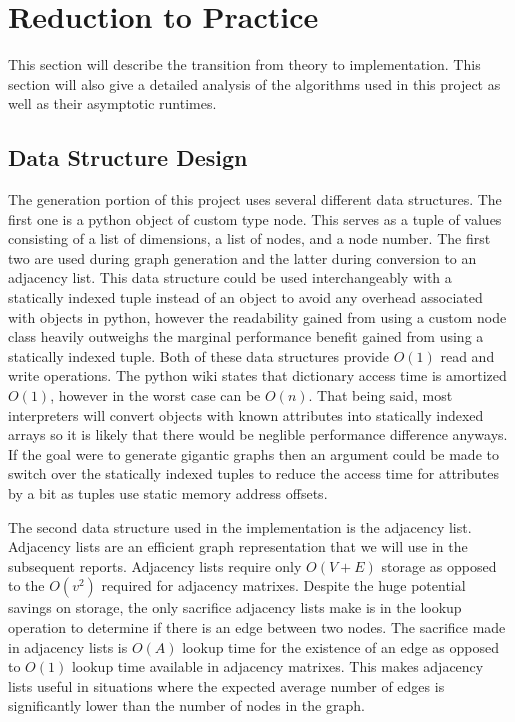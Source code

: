\documentclass{article}
\begin{document}
  \section{Reduction to Practice}
    This section will describe the transition from theory to implementation.
    This section will also give a detailed analysis of the algorithms used in this project as well as their asymptotic runtimes.
	\subsection{Data Structure Design}
		The generation portion of this project uses several different data structures.
		The first one is a python object of custom type node.
		This serves as a tuple of values consisting of a list of dimensions, a list of nodes, and a node number.
		The first two are used during graph generation and the latter during conversion to an adjacency list.
		This data structure could be used interchangeably with a statically indexed tuple instead of an object to avoid any overhead associated with objects in python, however the readability gained from using a custom node class heavily outweighs the marginal performance benefit gained from using a statically indexed tuple.
		Both of these data structures provide $O(1)$ read and write operations.
    The python wiki states that dictionary access time is amortized $O(1)$, however in the worst case can be $O(n)$\cite{pythonwikiruntimes}.
    That being said, most interpreters will convert objects with known attributes into statically indexed arrays so it is likely that there would be neglible performance difference anyways.
		If the goal were to generate gigantic graphs then an argument could be made to switch over the statically indexed tuples to reduce the access time for attributes by a bit as tuples use static memory address offsets.

		The second data structure used in the implementation is the adjacency list.
		Adjacency lists are an efficient graph representation that we will use in the subsequent reports.
		Adjacency lists require only $O(V+E)$ storage as opposed to the $O(v^2)$ required for adjacency matrixes.
    Despite the huge potential savings on storage, the only sacrifice adjacency lists make is in the lookup operation to determine if there is an edge between two nodes.
    The sacrifice made in adjacency lists is $O(A)$ lookup time for the existence of an edge as opposed to $O(1)$ lookup time available in adjacency matrixes.
		This makes adjacency lists useful in situations where the expected average number of edges is significantly lower than the number of nodes in the graph.
\end{document}
